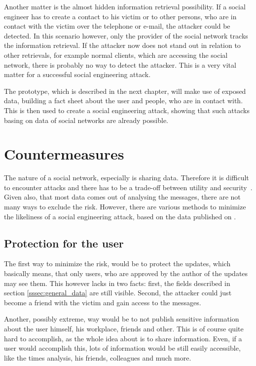Another matter is the almost hidden information retrieval possibility. If a
social engineer has to create a contact to his victim or to other persons, who
are in contact with the victim over the telephone or e-mail, the attacker could
be detected. In this scenario however, only the provider of the social network
tracks the information retrieval. If the attacker now does not stand out in
relation to other retrievals, for example normal clients, which are accessing the social
network, there is probably no way to detect the attacker. This is a very vital
matter for a successful social engineering attack.

The prototype, which is described in the next chapter, will make
use of exposed data, building a fact sheet about the user and people, who are
in contact with. This is then used to create a social engineering attack,
showing that such attacks basing on data of social networks are already
possible.

\section{Countermeasures}

The nature of a social network, especially \Twitter{} is sharing data.
Therefore it is difficult to encounter attacks and there has to be a trade-off
between utility and security~\cite{brown2008}. Given also, that most data comes
out of analysing the messages, there are not many ways to exclude the risk.
However, there are various methods to minimize the likeliness of a social
engineering attack, based on the data published on \Twitter{}.

\subsection{Protection for the user}

The first way to minimize the risk, would be to protect the updates, which
basically means, that only users, who are approved by the author of the updates
may see them. This however lacks in two facts: first, the fields described in
section \ref{sssec:general_data} are still visible. Second, the attacker could
just become a friend with the victim and gain access to the messages.

Another, possibly extreme, way would be to not publish sensitive information
about the user himself, his workplace, friends and other. This is of course
quite hard to accomplish, as the whole idea about \Twitter{} is to share
information. Even, if a user would accomplish this, lots of information would
be still easily accessible, like the times analysis, his friends, colleagues
and much more.


